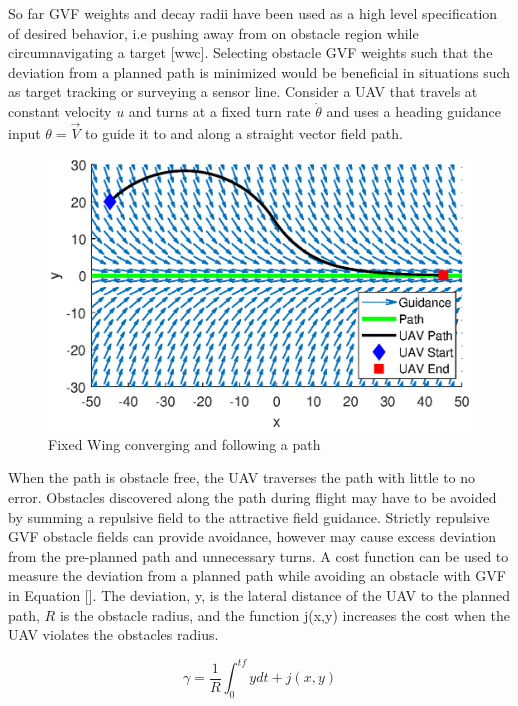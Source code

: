\documentclass[numbered,pdftex]{ohio-etd}
\begin{document}
So far GVF weights and decay radii have been used as a high level specification of desired behavior, i.e pushing away from on obstacle region while circumnavigating a target [wwc].  Selecting obstacle GVF weights such that the deviation from a planned path is minimized would be beneficial in situations such as target tracking or surveying a sensor line. Consider a UAV that travels at constant velocity $u$ and turns at a fixed turn rate $\dot{\theta}$ and uses a heading guidance input $\theta = \overrightarrow{V}$ to guide it to and along a straight vector field path. 

\begin{figure}[H]
	\centering
	\includegraphics[trim=0 25 0 45,clip,width=14cm]{PaperFigures/Methods/uavPathFollowDemo}
	\caption{Fixed Wing converging and following a path}
	\label{fig:uavPathFollowDemo}
\end{figure}

When the path is obstacle free, the UAV traverses the path with little to no error. Obstacles discovered along the path during flight may have to be avoided by summing a repulsive field to the attractive field guidance. Strictly repulsive GVF obstacle fields can provide avoidance, however may cause excess deviation from the pre-planned path and unnecessary turns. A cost function can be used to measure the deviation from a planned path while avoiding an obstacle with GVF in Equation []. The deviation, y, is the lateral distance of the UAV to the planned path, $R$ is the obstacle radius, and the function j(x,y) increases the cost when the UAV violates the obstacles radius.

\begin{equation}
\label{eq:staticCost}
\gamma = \frac{1}{R}\int_{0}^{tf}ydt + j(x,y) 
\end{equation}
\end{document}
